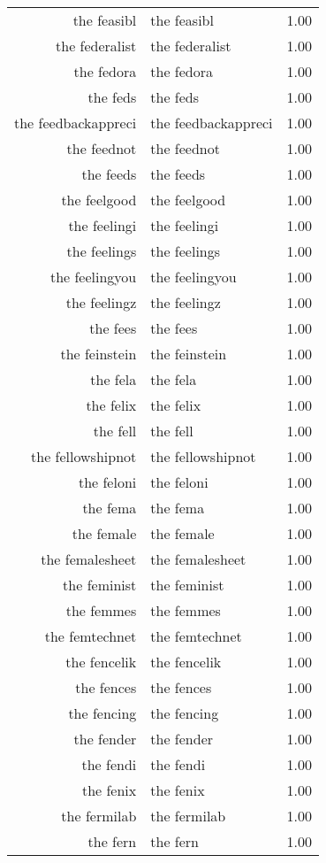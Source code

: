 \begin{table}[ht]
\begin{tabular}{rlr}
  the feasibl & the feasibl & 1.00 \\ 
  the federalist & the federalist & 1.00 \\ 
  the fedora & the fedora & 1.00 \\ 
  the feds & the feds & 1.00 \\ 
  the feedbackappreci & the feedbackappreci & 1.00 \\ 
  the feednot & the feednot & 1.00 \\ 
  the feeds & the feeds & 1.00 \\ 
  the feelgood & the feelgood & 1.00 \\ 
  the feelingi & the feelingi & 1.00 \\ 
  the feelings & the feelings & 1.00 \\ 
  the feelingyou & the feelingyou & 1.00 \\ 
  the feelingz & the feelingz & 1.00 \\ 
  the fees & the fees & 1.00 \\ 
  the feinstein & the feinstein & 1.00 \\ 
  the fela & the fela & 1.00 \\ 
  the felix & the felix & 1.00 \\ 
  the fell & the fell & 1.00 \\ 
  the fellowshipnot & the fellowshipnot & 1.00 \\ 
  the feloni & the feloni & 1.00 \\ 
  the fema & the fema & 1.00 \\ 
  the female & the female & 1.00 \\ 
  the femalesheet & the femalesheet & 1.00 \\ 
  the feminist & the feminist & 1.00 \\ 
  the femmes & the femmes & 1.00 \\ 
  the femtechnet & the femtechnet & 1.00 \\ 
  the fencelik & the fencelik & 1.00 \\ 
  the fences & the fences & 1.00 \\ 
  the fencing & the fencing & 1.00 \\ 
  the fender & the fender & 1.00 \\ 
  the fendi & the fendi & 1.00 \\ 
  the fenix & the fenix & 1.00 \\ 
  the fermilab & the fermilab & 1.00 \\ 
  the fern & the fern & 1.00 \\ 

\end{tabular}
\end{table}

